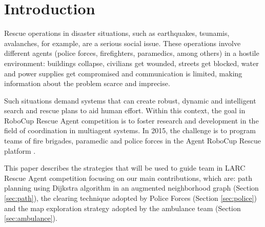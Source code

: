 \section{Introduction}
\label{sec:intro}

Rescue operations in disaster situations, such as earthquakes, tsunamis, avalanches, for example, are a serious social issue. These operations involve different agents (police forces, firefighters, paramedics, among others) in a hostile environment: buildings collapse, civilians get wounded, streets get blocked, water and power supplies get compromised and communication is limited, making information about the problem scarce and imprecise.

Such situations demand systems that can create robust, dynamic and intelligent search and rescue plans to aid human effort. Within this context, the goal in RoboCup Rescue Agent competition is to foster research and development in the field of coordination in multiagent systems. In 2015, the challenge is to program teams of fire brigades, paramedic and police forces in the Agent RoboCup Rescue platform \cite{Kitano2000}.%


This paper describes the strategies that will be used to guide \teamname team in  LARC Rescue Agent competition focusing on our main contributions, which are: path planning using Dijkstra algorithm in an augmented neighborhood graph (Section \ref{sec:path}), the clearing technique adopted by Police Forces (Section \ref{sec:police}) and the map exploration strategy adopted by the ambulance team (Section \ref{sec:ambulance}).
